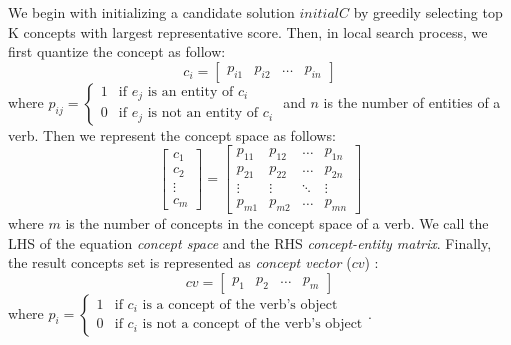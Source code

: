 
We begin with initializing a candidate solution $initialC$
by greedily selecting top K concepts with largest representative score.
Then, in local search process, we first quantize the concept as follow:
$$
c_i =
\left[
\begin{array}{cccc}
p_{i1} & p_{i2} & \ldots & p_{in}
\end{array}
\right]
$$
where
$
p_{ij} = \left\{ \begin{array}{ll}
1 & \textrm{if $e_j$ is an entity of $c_i$}\\
0 & \textrm{if $e_j$ is not an entity of $c_i$}
\end{array} \right.
$
and $n$ is the number of entities of a verb.
Then we represent the concept space as follows:
$$
\left[
\begin{array}{c}
c_1\\
c_2\\
\vdots\\
c_m
\end{array}
\right]
=
\left[
\begin{array}{cccc}
p_{11} & p_{12} & \dots & p_{1n}\\
p_{21} & p_{22} & \dots & p_{2n}\\
\vdots & \vdots & \ddots & \vdots\\
p_{m1} & p_{m2} & \dots & p_{mn}
\end{array}
\right]
$$
where $m$ is the number of concepts in the concept space of a verb.
We call the LHS of the equation \emph{concept space} and the RHS
\emph{concept-entity matrix}.
Finally, the result concepts set is represented as \emph{concept vector} ($cv$) :
$$
cv
=
\left[
\begin{array}{cccc}
p_{1} & p_{2} & \ldots & p_{m}
\end{array}
\right]
$$
where
$
p_{i} = \left\{ \begin{array}{ll}
1 & \textrm{if $c_i$ is a concept of the verb's object}\\
0 & \textrm{if $c_i$ is not a concept of the verb's object}
\end{array} \right.
$.


